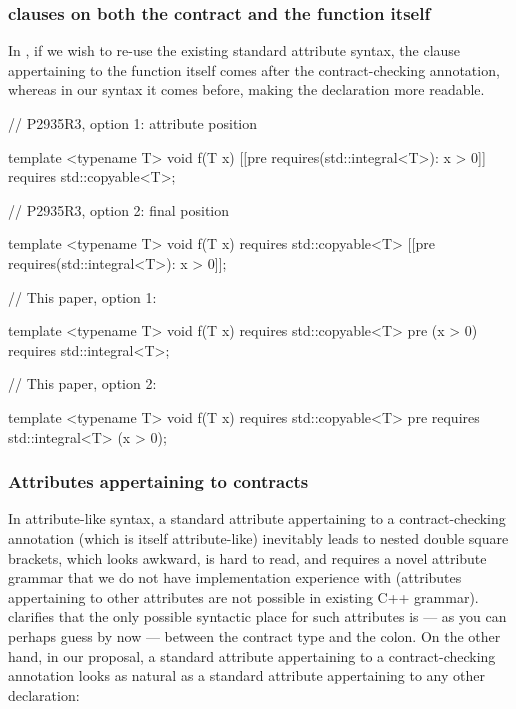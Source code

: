\subsubsection{ clauses on both the contract and the function itself}

In \cite{P2935R3}, if we wish to re-use the existing standard attribute syntax, the  clause appertaining to the function itself comes after the contract-checking annotation, whereas in our syntax it comes before, making the declaration more readable.

\begin{minipage}[t]{8.7cm}
\begin{codeblock}
// P2935R3, option 1: attribute position

template <typename T>
void f(T x)
  [[pre requires(std::integral<T>): x > 0]]
  requires std::copyable<T>;
    
// P2935R3, option 2: final position

template <typename T>
void f(T x)
  requires std::copyable<T>
  [[pre requires(std::integral<T>): x > 0]];
\end{codeblock}
\end{minipage}
\begin{minipage}[t]{8cm}
\begin{codeblock}
// This paper, option 1:

template <typename T>
void f(T x)
  requires std::copyable<T>
  pre (x > 0) requires std::integral<T>;
    
// This paper, option 2:

template <typename T>
void f(T x)
  requires std::copyable<T>
  pre requires std::integral<T> (x > 0);
\end{codeblock}
\end{minipage}

\subsubsection{Attributes appertaining to contracts}

In attribute-like syntax, a standard attribute appertaining to a contract-checking annotation (which is itself attribute-like) inevitably leads to nested double square brackets, which looks awkward, is hard to read, and requires a novel attribute grammar that we do not have implementation experience with (attributes appertaining to other attributes are not possible in existing C++ grammar).  \cite{P2935R3} clarifies that the only possible syntactic place for such attributes is --- as you can perhaps guess by now --- between the contract type and the colon. On the other hand, in our proposal, a standard attribute appertaining to a contract-checking annotation looks as natural as a standard attribute appertaining to any other declaration:

